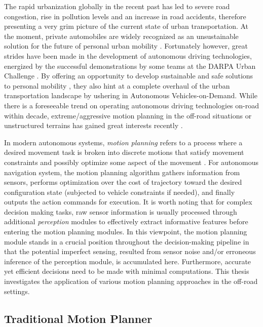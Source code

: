 \documentclass[../thesis.tex]{subfiles}
\begin{document}
The rapid urbanization globally in the recent past has led to severe road congestion, rise in pollution levels and an increase in road accidents, therefore presenting a very grim picture of the current state of urban transportation. 
At the moment, private automobiles are widely recognized as an unsustainable solution for the future of personal urban mobility \cite{reinventing}. 
Fortunately however, great strides have been made in the development of autonomous driving technologies, energized by the successful demonstrations by some teams at the DARPA Urban Challenge \cite{boss, multimodaltartan}. 
By offering an opportunity to develop sustainable and safe solutions to personal mobility \cite{usecases_of_AD}, they also hint at a complete overhaul of the urban transportation landscape by ushering in Autonomous Vehicles-on-Demand. 
While there is a foreseeable trend on operating autonomous driving technologies on-road within decade, extreme/aggressive motion planning in the off-road situations or unstructured terrains has gained great interests recently \cite{kolter2010probabilistic,williams2016aggressive,gray2012predictive,cutler2016autonomous,cutler2014reinforcement}. 
 
In modern autonomous systems, \textit{motion planning} refers to a process where a desired movement task is broken into discrete motions that satisfy movement constraints and possibly optimize some aspect of the movement \cite{wiki:motion-planning}. 
For autonomous navigation system, the motion planning algorithm gathers information from sensors, performs optimization over the cost of trajectory toward the desired configuration state (subjected to vehicle constraints if needed), and finally outputs the action commands for execution. 
It is worth noting that for complex decision making tasks, raw sensor information is usually processed through additional \textit{perception} modules to effectively extract informative features before entering the motion planning modules.
In this viewpoint, the motion planning module stands in a crucial position throughout the decision-making pipeline in that the potential imperfect sensing, resulted from sensor noise and/or erroneous inference of the perception module, is accumulated here. 
Furthermore, accurate yet efficient decisions need to be made with minimal computations.
This thesis investigates the application of various motion planning approaches in the off-road settings.
 
\subsection{Traditional Motion Planner}
 
\end{document}
